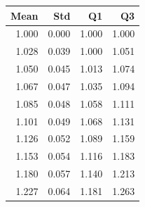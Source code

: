 \begin{tabular}{rrrr}
\toprule
Mean & Std & Q1 & Q3 \\
\midrule
1.000 & 0.000 & 1.000 & 1.000 \\
1.028 & 0.039 & 1.000 & 1.051 \\
1.050 & 0.045 & 1.013 & 1.074 \\
1.067 & 0.047 & 1.035 & 1.094 \\
1.085 & 0.048 & 1.058 & 1.111 \\
1.101 & 0.049 & 1.068 & 1.131 \\
1.126 & 0.052 & 1.089 & 1.159 \\
1.153 & 0.054 & 1.116 & 1.183 \\
1.180 & 0.057 & 1.140 & 1.213 \\
1.227 & 0.064 & 1.181 & 1.263 \\
\bottomrule
\end{tabular}
